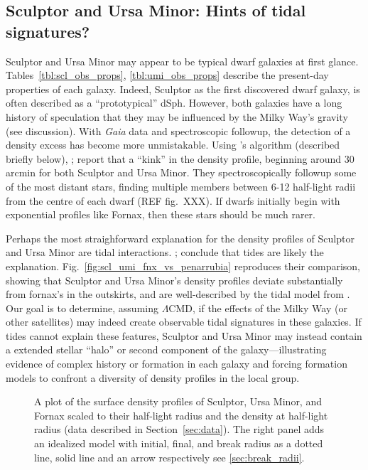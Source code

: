 \subsection{Sculptor and Ursa Minor: Hints of tidal
signatures?}\label{sculptor-and-ursa-minor-hints-of-tidal-signatures}

Sculptor and Ursa Minor may appear to be typical dwarf galaxies at first
glance. Tables~\ref{tbl:scl_obs_props}, \ref{tbl:umi_obs_props} describe
the present-day properties of each galaxy. Indeed, Sculptor as the first
discovered dwarf galaxy, is often described as a ``prototypical'' dSph.
However, both galaxies have a long history of speculation that they may
be influenced by the Milky Way's gravity (see discussion). With
\emph{Gaia} data and spectroscopic followup, the detection of a density
excess has become more unmistakable. Using \citet{jensen+2024}'s
algorithm (described briefly below), \citet{sestito+2023a};
\citet{sestito+2023b} report that a ``kink'' in the density profile,
beginning around 30 arcmin for both Sculptor and Ursa Minor. They
spectroscopically followup some of the most distant stars, finding
multiple members between 6-12 half-light radii from the centre of each
dwarf (REF fig.~XXX). If dwarfs initially begin with exponential
profiles like Fornax, then these stars should be much rarer.

Perhaps the most straighforward explanation for the density profiles of
Sculptor and Ursa Minor are tidal interactions. \citet{sestito+2023a};
\citet{sestito+2023b} conclude that tides are likely the explanation.
Fig.~\ref{fig:scl_umi_fnx_vs_penarrubia} reproduces their comparison,
showing that Sculptor and Ursa Minor's density profiles deviate
substantially from fornax's in the outskirts, and are well-described by
the tidal model from \citet{PNM2008}. Our goal is to determine, assuming
\(\Lambda\)CMD, if the effects of the Milky Way (or other satellites)
may indeed create observable tidal signatures in these galaxies. If
tides cannot explain these features, Sculptor and Ursa Minor may instead
contain a extended stellar ``halo'' or second component of the
galaxy---illustrating evidence of complex history or formation in each
galaxy and forcing formation models to confront a diversity of density
profiles in the local group.

\begin{figure}
\centering
{}
\caption[Sculptor and Ursa Minor match tidal models]{A plot of the
surface density profiles of Sculptor, Ursa Minor, and Fornax scaled to
their half-light radius and the density at half-light radius (data
described in Section~\ref{sec:data}). The right panel adds an idealized
model with initial, final, and break radius as a dotted line, solid line
and an arrow respectively see
\ref{sec:break_radii}.}\label{fig:scl_umi_vs_penarrubia}
\end{figure}


